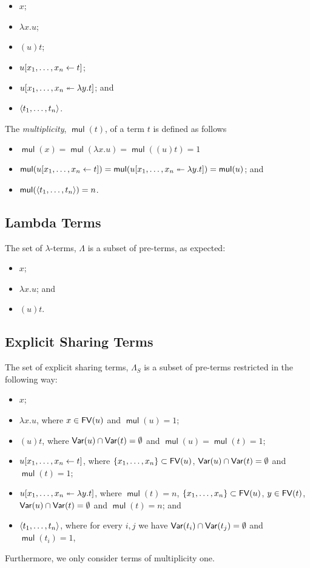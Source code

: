 \documentclass[10pt,a4paper]{article}
\theoremstyle{definition}
\theoremstyle{plain}
\theoremstyle{remark}
\begin{document}
\newcommand{\mul}{{\mathop{\mathsf{mul}}}}

\begin{itemize}
	\item $x$;
	\item $\lambda x.u$;
	\item $(u)t$;
	\item ${ { {u}[{{x_1},\dots,{x_n}}\leftarrow{t}] } }$;
	\item ${ { {u}[{{x_1},\dots,{x_n}}\twoheadleftarrow{\lambda{y}.{t}}] } }$; and
	\item ${ {\langle} {t_1},\dots,{t_n} {\rangle} }$.
\end{itemize}

The \emph{multiplicity}, $\mul(t)$, of a term $t$ is defined as follows

\begin{itemize}
	\item $\mul(x)=\mul(\lambda x.u)=\mul((u)t)=1$
	\item $\mul(\tershare{u}{x_1}{x_n}{t})=\mul(\terdist{u}{x_1}{x_n}{y}{t})=\mul(u)$; and
	\item $\mul(\tertuple{t_1}{t_n})=n$.
\end{itemize}

\subsection{Lambda Terms}

The set of $\lambda$-terms, $\Lambda$ is a subset of pre-terms, as expected:

\begin{itemize}
	\item $x$;
	\item $\lambda x.u$; and
	\item $(u)t$.
\end{itemize}

\subsection{Explicit Sharing Terms}

The set of explicit sharing terms, $\Lambda_S$ is a subset of pre-terms restricted in the following way:

\begin{itemize}
	\item $x$;
	\item $\lambda x.u$, where $x\in{\mathop{\mathsf{FV}}}(u)$ and $\mul(u)=1$;
	\item $(u)t$, where ${\mathop{\mathsf{Var}}}(u)\cap{\mathop{\mathsf{Var}}}(t)=\emptyset$ and $\mul(u)=\mul(t)=1$;
	\item ${ { {u}[{{x_1},\dots,{x_n}}\leftarrow{t}] } }$, where $\{x_1,\dots,x_n\}\subset{\mathop{\mathsf{FV}}}(u)$, ${\mathop{\mathsf{Var}}}(u)\cap{\mathop{\mathsf{Var}}}(t)=\emptyset$ and $\mul(t)=1$;
	\item ${ { {u}[{{x_1},\dots,{x_n}}\twoheadleftarrow{\lambda{y}.{t}}] } }$, where $\mul(t)=n$, $\{x_1,\dots,x_n\}\subset{\mathop{\mathsf{FV}}}(u)$, $y\in{\mathop{\mathsf{FV}}}(t)$, ${\mathop{\mathsf{Var}}}(u)\cap{\mathop{\mathsf{Var}}}(t)=\emptyset$ and $\mul(t)=n$; and
	\item ${ {\langle} {t_1},\dots,{t_n} {\rangle} }$, where for every $i,j$ we have ${\mathop{\mathsf{Var}}}(t_i)\cap{\mathop{\mathsf{Var}}}(t_j)=\emptyset$ and $\mul(t_i)=1$,
\end{itemize}
Furthermore, we only consider terms of multiplicity one.
\end{document}
